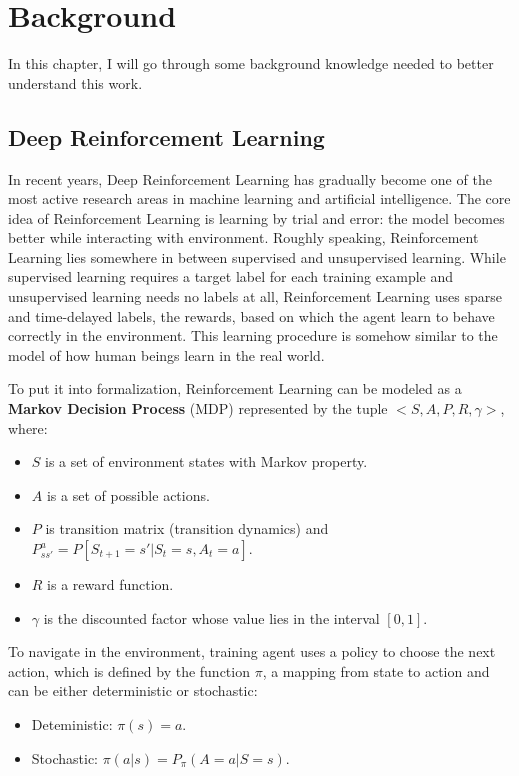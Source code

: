 \chapter{Background}
In this chapter, I will go through some background knowledge needed to better understand this work.

\section{Deep Reinforcement Learning}
In recent years, Deep Reinforcement Learning has gradually become one of the most active research areas in machine learning and artificial intelligence. The core idea of Reinforcement Learning is learning by trial and error: the model becomes better while interacting with environment. Roughly speaking, Reinforcement Learning lies somewhere in between supervised and unsupervised learning. While supervised learning requires a target label for each training example and unsupervised learning needs no labels at all, Reinforcement Learning uses sparse and time-delayed labels, the rewards, based on which the agent learn to behave correctly in the environment. This learning procedure is somehow similar to the model of how human beings learn in the real world. 

To put it into formalization, Reinforcement Learning can be modeled as a \textbf{Markov Decision Process} (MDP) represented by the tuple $<S, A, P, R, \gamma>$, where:
\begin{itemize}
\item $S$ is a set of environment states with Markov property.
\item $A$ is a set of possible actions.
\item $P$ is transition matrix (transition dynamics) and $P^a_{ss'} = P[S_{t+1} = s' | S_t = s, A_t = a]$.
\item $R$ is a reward function.
\item $\gamma$ is the discounted factor whose value lies in the interval $[0, 1]$.

\end{itemize}

To navigate in the environment, training agent uses a policy to choose the next action, which is defined by the function $\pi$, a mapping from state to action and can be either deterministic or stochastic:
\begin{itemize}
\item Deteministic: $\pi(s) = a$.
\item Stochastic: $\pi(a|s) = P_{\pi}(A=a|S=s)$.
\end{itemize}

